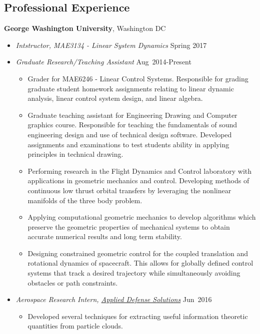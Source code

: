 \subsection*{Professional Experience}

\textbf{George Washington University}, Washington DC
    \begin{itemize}
        \item[] \textit{Intstructor, MAE3134 - Linear System Dynamics} \hfill {Spring 2017}
        \item[] \textit{Graduate Research/Teaching Assistant} \hfill {Aug~2014-Present}
        \begin{itemize}
            \item Grader for MAE6246 - Linear Control Systems. 
            Responsible for grading graduate student homework assignments relating to linear dynamic analysis, linear control system design, and linear algebra. 
            \item Graduate teaching assistant for Engineering Drawing and Computer graphics course.
            Responsible for teaching the fundamentals of sound engineering design and use of technical design software.
            Developed assignments and examinations to test students ability in applying principles in technical drawing.
            \item Performing research in the Flight Dynamics and Control laboratory with applications in geometric mechanics and control. 
            Developing methods of continuous low thrust orbital transfers by leveraging the nonlinear manifolds of the three body problem.
            \item Applying computational geometric mechanics to develop algorithms which preserve the geometric properties of mechanical systems to obtain accurate numerical results and long term stability.
            \item Designing constrained geometric control for the coupled translation and rotational dynamics of spacecraft.
            This allows for globally defined control systems that track a desired trajectory while simultaneously avoiding obstacles or path constraints.
        \end{itemize}
        \item[] \textit{Aerospace Research Intern, \href{http://www.applieddefense.com/}{Applied Defense Solutions}} \hfill {Jun~2016}
        \begin{itemize}
            \item Developed several techniques for extracting useful information theoretic quantities from particle clouds. 

\end{itemize}
\end{itemize}
